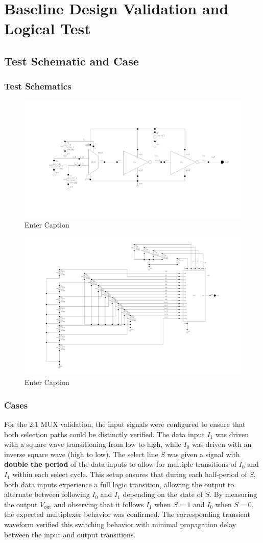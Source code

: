 \documentclass[12pt]{article}
\begin{document}
\newpage

\section{Baseline Design Validation and Logical Test}
\subsection{Test Schematic and Case}
\subsubsection*{Test Schematics}

\begin{figure}[H]
    \centering
    \includegraphics[width=0.5\linewidth]{writeup//figures/muxsubtestschem.png}
    \caption{Enter Caption}
\end{figure}

\begin{figure}[H]
    \centering
    \includegraphics[width=0.5\linewidth]{writeup//figures/luttestschem.png}
    \caption{Enter Caption}
\end{figure}

\subsubsection*{Cases}
For the 2:1 MUX validation, the input signals were configured to ensure that both selection paths could be distinctly verified. The data input \( I_1 \) was driven with a square wave transitioning from low to high, while \( I_0 \) was driven with an inverse square wave (high to low). The select line \( S \) was given a signal with \textbf{double the period} of the data inputs to allow for multiple transitions of \( I_0 \) and \( I_1 \) within each select cycle. 
This setup ensures that during each half-period of \( S \), both data inputs experience a full logic transition, allowing the output to alternate between following \( I_0 \) and \( I_1 \) depending on the state of \( S \). 
By measuring the output \( V_{\text{out}} \) and observing that it follows \( I_1 \) when \( S=1 \) and \( I_0 \) when \( S=0 \), the expected multiplexer behavior was confirmed. The corresponding transient waveform verified this switching behavior with minimal propagation delay between the input and output transitions.
\end{document}

